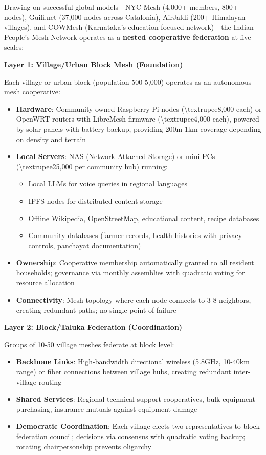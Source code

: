 Drawing on successful global models---NYC Mesh (4,000+ members, 800+
nodes), Guifi.net (37,000 nodes across Catalonia), AirJaldi (200+
Himalayan villages), and COWMesh (Karnataka's education-focused
network)---the Indian People's Mesh Network operates as a \textbf{nested
cooperative federation} at five scales:

\textbf{Layer 1: Village/Urban Block Mesh (Foundation)}

Each village or urban block (population 500-5,000) operates as an
autonomous mesh cooperative:

\begin{itemize}
\tightlist
\item
  \textbf{Hardware}: Community-owned Raspberry Pi nodes
  (\textbackslash textrupee8,000 each) or OpenWRT routers with LibreMesh
  firmware (\textbackslash textrupee4,000 each), powered by solar panels
  with battery backup, providing 200m-1km coverage depending on density
  and terrain
\item
  \textbf{Local Servers}: NAS (Network Attached Storage) or mini-PCs
  (\textbackslash textrupee25,000 per community hub) running:

  \begin{itemize}
  \tightlist
  \item
    Local LLMs for voice queries in regional languages
  \item
    IPFS nodes for distributed content storage
  \item
    Offline Wikipedia, OpenStreetMap, educational content, recipe
    databases
  \item
    Community databases (farmer records, health histories with privacy
    controls, panchayat documentation)
  \end{itemize}
\item
  \textbf{Ownership}: Cooperative membership automatically granted to
  all resident households; governance via monthly assemblies with
  quadratic voting for resource allocation
\item
  \textbf{Connectivity}: Mesh topology where each node connects to 3-8
  neighbors, creating redundant paths; no single point of failure
\end{itemize}

\textbf{Layer 2: Block/Taluka Federation (Coordination)}

Groups of 10-50 village meshes federate at block level:

\begin{itemize}
\tightlist
\item
  \textbf{Backbone Links}: High-bandwidth directional wireless (5.8GHz,
  10-40km range) or fiber connections between village hubs, creating
  redundant inter-village routing
\item
  \textbf{Shared Services}: Regional technical support cooperatives,
  bulk equipment purchasing, insurance mutuals against equipment damage
\item
  \textbf{Democratic Coordination}: Each village elects two
  representatives to block federation council; decisions via consensus
  with quadratic voting backup; rotating chairpersonship prevents
  oligarchy
\end{itemize}

